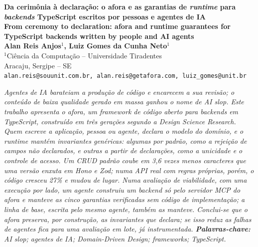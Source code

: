 \documentclass[a4paper,12pt]{article}
\newenvironment{resumo}{%
  \list{}{\advance\topsep by6pt\relax
    \leftmargin=0.8cm
    \labelwidth=0pt
    \listparindent=0pt
    \itemindent\listparindent
    \rightmargin\leftmargin}\item[\hskip\labelsep\bfseries\itshape Resumo.]\itshape}%
  {\endlist}
\begin{document}
\pagestyle{empty}

\begin{center}
  {\fontsize{16}{20}\selectfont\bfseries Da cerimônia à declaração: o afora e as garantias de \textit{runtime} para \textit{backends} TypeScript escritos por pessoas e agentes de IA}\\[4pt]
  {\fontsize{14}{18}\selectfont\bfseries From ceremony to declaration: afora and runtime guarantees for TypeScript backends written by people and AI agents}\\[12pt]

  {\normalsize\bfseries Alan Reis Anjos$^{1}$, Luiz Gomes da Cunha Neto$^{1}$}\\[6pt]

  {\normalsize
    $^{1}$Ciência da Computação -- Universidade Tiradentes\\{}
    Aracaju, Sergipe -- SE\\{}
    \footnotesize\texttt{alan.reis@souunit.com.br, alan.reis@getafora.com, luiz\_gomes@unit.br}
  }
\end{center}
\vspace{12pt}

\begin{resumo}
Agentes de IA barateiam a produção de código e encarecem a sua revisão; o conteúdo de baixa qualidade gerado em massa ganhou o nome de \textit{AI slop}. Este trabalho apresenta o afora, um \textit{framework} de código aberto para \textit{backends} em TypeScript, construído em três gerações segundo a Design Science Research. Quem escreve a aplicação, pessoa ou agente, declara o modelo do domínio, e o \textit{runtime} mantém invariantes genéricas: algumas por padrão, como a rejeição de campos não declarados, e outras a partir de declarações, como a unicidade e o controle de acesso. Um CRUD padrão coube em 3,6 vezes menos caracteres que uma versão enxuta em Hono e Zod; numa API real com regras próprias, porém, o código cresceu 27\% e mudou de lugar. Numa avaliação de viabilidade, com uma execução por lado, um agente construiu um \textit{backend} só pelo servidor MCP do afora e manteve as cinco garantias verificadas sem código de implementação; a linha de base, escrita pelo mesmo agente, também as manteve. Conclui-se que o afora preserva, por construção, as invariantes que declara; se isso reduz as falhas de agentes fica para uma avaliação em lote, já instrumentada.
\end{resumo}
\noindent\textbf{Palavras-chave:} \textit{AI slop}; agentes de IA; Domain-Driven Design; \textit{frameworks}; TypeScript.
\end{document}
